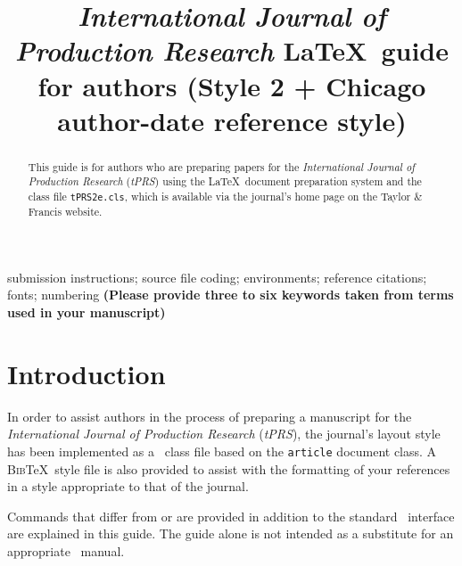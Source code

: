 \documentclass{tPRS2e}
\begin{document}


\title{\textit{International Journal of Production Research} \LaTeX\ guide for authors \break (Style 2 + Chicago author-date reference style)}

\author{
}

\maketitle

\begin{abstract}
This guide is for authors who are preparing papers for the \textit{International Journal of Production Research}
(\textit{tPRS}) using the \LaTeX\ document preparation system and the class file \texttt{tPRS2e.cls},
which is available via the journal's home page on the Taylor \& Francis website.
\end{abstract}

\begin{keywords}
submission instructions; source file coding; environments; reference citations; fonts; numbering
\textbf{(Please provide three to six keywords taken from terms used in your manuscript)}
\end{keywords}


\section{Introduction}

In order to assist authors in the process of preparing a manuscript for the \textit{International Journal of Production Research} (\textit{tPRS}), the journal's layout style has been implemented as a \LaTeXe\ class file based on the \texttt{article} document class. A \textsc{Bib}\TeX\ style file is also provided to assist with the formatting of your references in a style appropriate to that of the journal.

Commands that differ from or are provided in addition to the standard \LaTeXe\ interface are explained in this guide. The guide alone is not intended as a substitute for an appropriate \LaTeXe\ manual.
\end{document}
